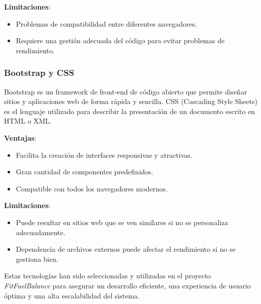\textbf{Limitaciones}:
\begin{itemize}
  \item Problemas de compatibilidad entre diferentes navegadores.
  \item Requiere una gestión adecuada del código para evitar problemas de rendimiento.
\end{itemize}

\subsubsection{Bootstrap y CSS}

Bootstrap es un framework de front-end de código abierto que permite diseñar sitios y aplicaciones web de forma rápida y sencilla. CSS (Cascading Style Sheets) es el lenguaje utilizado para describir la presentación de un documento escrito en HTML o XML.

\textbf{Ventajas}:
\begin{itemize}
  \item Facilita la creación de interfaces responsivas y atractivas.
  \item Gran cantidad de componentes predefinidos.
  \item Compatible con todos los navegadores modernos.
\end{itemize}

\textbf{Limitaciones}:
\begin{itemize}
  \item Puede resultar en sitios web que se ven similares si no se personaliza adecuadamente.
  \item Dependencia de archivos externos puede afectar el rendimiento si no se gestiona bien.
\end{itemize}

Estas tecnologías han sido seleccionadas y utilizadas en el proyecto \textit{FitFuelBalance} para asegurar un desarrollo eficiente, una experiencia de usuario óptima y una alta escalabilidad del sistema.